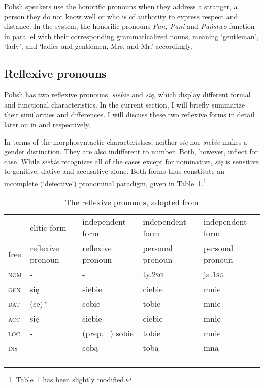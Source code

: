 \documentclass[output=paper]{langscibook}
\begin{document}
Polish speakers use the honorific pronouns when they address a stranger, a person they do not know well or who is of authority to express respect and distance. In the system, the honorific pronouns \textit{Pan, Pani} and \textit{Państwo} function in parallel with their corresponding grammaticalized nouns, meaning ‘gentleman’, ‘lady’, and ‘ladies and gentlemen, Mrs. and Mr.’ accordingly. 


\subsection{Reflexive pronouns} \label{sec:Janic:2.2}

Polish has two reflexive pronouns, \textit{siebie} and \textit{się}, which display different formal and functional characteristics. In the current section, I will briefly summarize their similarities and differences. I will discuss these two reflexive forms in detail later on in  and  respectively. 

In terms of the morphosyntactic characteristics, neither \textit{się} nor \textit{siebie} makes a gender distinction. They are also indifferent to number. Both, however, inflect for case. While \textit{siebie} recognizes all of the cases except for nominative, \textit{się} is sensitive to genitive, dative and accusative alone. Both forms thus constitute an incomplete (‘defective’) pronominal paradigm, given in Table~\ref{tab:Janic:3}.\footnote{Table~\ref{tab:Janic:3} has been slightly modified.}


			

\begin{table}[ht]
 \centering
 \begin{tabularx}{\textwidth}{p{0.8cm}p{1.8cm}p{2.7cm}p{2.7cm}p{2.7cm}}
 
 \lsptoprule
 {} & {clitic form} & {independent form} & {independent form} & {independent form}\\
 {free} & {reflexive pronoun} & {reflexive pronoun} & {personal pronoun} & {personal pronoun}\\
 
 \hline
 \textsc{nom}	& - & -	 & ty.\textsc{2sg}	 & ja.\textsc{1sg} \\
 \textsc{gen}	& się &	siebie	 & ciebie 	 & mnie \\
 \textsc{dat}	& (se)* &	sobie & tobie	 & mnie \\
 \textsc{acc}	& się	 & siebie	 & ciebie &	mnie \\
 \textsc{loc}	& -	 & (prep.+) sobie	 & tobie	 & mnie \\
 \textsc{ins}	& -	 & sobą	 & tobą	 & mną \\
 \lspbottomrule
 \end{tabularx}
 \caption{The reflexive pronouns, adopted from \citet[517]{Wiemer2007}}
 \label{tab:Janic:3}
\end{table}
\end{document}
